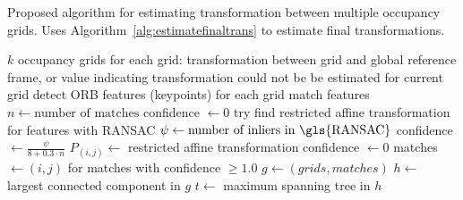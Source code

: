 \documentclass[17pt, a0paper, portrait]{tikzposter}
\begin{document}
\begin{columns}
{\begin{algorithm}[H]
    \caption{Proposed algorithm for estimating transformation between multiple occupancy grids. Uses Algorithm~\ref{alg:estimatefinaltrans} to estimate final transformations.}
    \label{alg:estimategridtrasform}
    \begin{algorithmic}[1]
        \Require $k$ occupancy grids
        \Ensure for each grid: transformation between grid and global reference frame, or value indicating transformation could not be be estimated for current grid
            \State detect \gls{ORB} features (keypoints) for each grid
             
                \State match features
                \State $n \gets \text{number of matches}$
                    \State confidence $\gets 0$
                \Else
                    \State try find restricted affine transformation for features with \gls{RANSAC}
                    \State $\psi \gets \text{number of inliers in \gls{RANSAC}}$
                        \State confidence $\gets \frac{\psi}{8 + 0.3 \cdot n}$
                        \State $P_{(i,j)} \gets$ restricted affine transformation
                    \Else
                        \State confidence $\gets 0$
                    \EndIf
                \EndIf
            \EndFor
            \State matches $\gets (i,j)$ for matches with confidence $\ge 1.0$
            \State $g \gets (grids, matches)$
            \State $h \gets$ largest connected component in $g$
            \State $t \gets$ maximum spanning tree in $h$
            \State {} 
        \EndProcedure
    \end{algorithmic}
\end{algorithm}


}
\end{columns}
\end{document}
